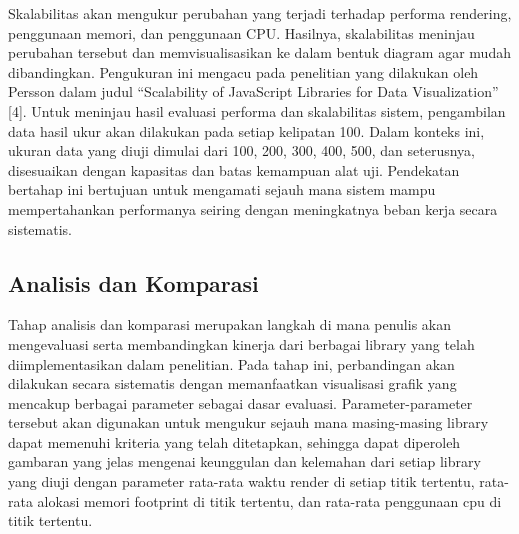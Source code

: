\begin{enumerate}
	Skalabilitas akan mengukur perubahan yang terjadi terhadap performa rendering, penggunaan memori, dan penggunaan CPU. Hasilnya, skalabilitas meninjau perubahan tersebut dan memvisualisasikan ke dalam bentuk diagram agar mudah dibandingkan. Pengukuran ini mengacu pada penelitian yang dilakukan oleh Persson dalam judul “Scalability of JavaScript Libraries for Data Visualization” [4].
	Untuk meninjau hasil evaluasi performa dan skalabilitas sistem, pengambilan data hasil ukur akan dilakukan pada setiap kelipatan 100. Dalam konteks ini, ukuran data yang diuji dimulai dari 100, 200, 300, 400, 500, dan seterusnya, disesuaikan dengan kapasitas dan batas kemampuan alat uji. Pendekatan bertahap ini bertujuan untuk mengamati sejauh mana sistem mampu mempertahankan performanya seiring dengan meningkatnya beban kerja secara sistematis.	
\end{enumerate}

\subsection{Analisis dan Komparasi}
Tahap analisis dan komparasi merupakan langkah di mana penulis akan mengevaluasi serta membandingkan kinerja dari berbagai library yang telah diimplementasikan dalam penelitian. Pada tahap ini, perbandingan akan dilakukan secara sistematis dengan memanfaatkan visualisasi grafik yang mencakup berbagai parameter sebagai dasar evaluasi. Parameter-parameter tersebut akan digunakan untuk mengukur sejauh mana masing-masing library dapat memenuhi kriteria yang telah ditetapkan, sehingga dapat diperoleh gambaran yang jelas mengenai keunggulan dan kelemahan dari setiap library yang diuji dengan parameter rata-rata waktu render di setiap titik tertentu, rata-rata alokasi memori footprint di titik tertentu, dan rata-rata penggunaan cpu di titik tertentu.
